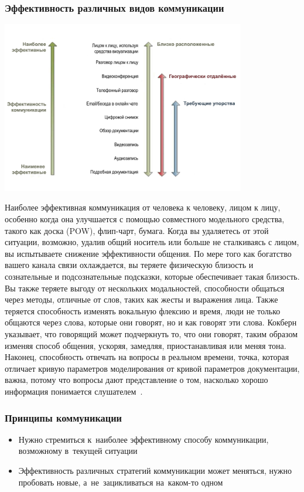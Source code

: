 \documentclass{../industrial-development}
\begin{document}
\begin{frame} \frametitle{Эффективность различных видов коммуникации}
\centerline{\includegraphics[width=0.8\textwidth]{CommunicationEffectiveness.pdf}}
\end{frame}

\lecturenotes

Наиболее эффективная коммуникация от человека к человеку, лицом к лицу, особенно когда она улучшается с помощью совместного модельного средства, такого как доска (POW), флип-чарт, бумага. Когда вы удаляетесь от этой ситуации, возможно, удалив общий носитель или больше не сталкиваясь с лицом, вы испытываете снижение эффективности общения. По мере того как богатство вашего канала связи охлаждается, вы теряете физическую близость и сознательные и подсознательные подсказки, которые обеспечивает такая близость. Вы также теряете выгоду от нескольких модальностей, способности общаться через методы, отличные от слов, таких как жесты и выражения лица. Также теряется способность изменять вокальную флексию и время, люди не только общаются через слова, которые они говорят, но и как говорят эти слова. Кокберн указывает, что говорящий может подчеркнуть то, что они говорят, таким образом изменяя способ общения, ускоряя, замедляя, приостанавливая или меняя тона. Наконец, способность отвечать на вопросы в реальном времени, точка, которая отличает кривую параметров моделирования от кривой параметров документации, важна, потому что вопросы дают представление о том, насколько хорошо информация понимается слушателем~\cite{AgileComm}.

\begin{frame} \frametitle{Принципы коммуникации}
  \begin{itemize}
  \item Нужно стремиться к~наиболее эффективному способу коммуникации, возможному в~текущей ситуации
  \item Эффективность различных стратегий коммуникации может меняться, нужно пробовать новые, а~не~зацикливаться на~каком-то одном
  \end{itemize}
\end{frame}
\end{document}
